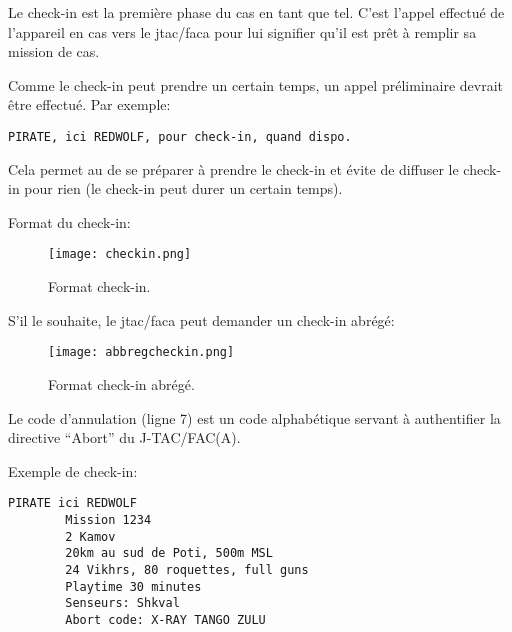 \begin{e1}
	\begin{minipage}{\linewidth}
		\item
		Le check-in est la première phase du \acrshort{cas} en tant que tel. C’est l’appel effectué de l’appareil en \acrshort{cas} vers le \acrshort{jtac}/\acrshort{faca} pour lui signifier qu’il est prêt à remplir sa mission de \acrshort{cas}.
		\item Comme le check-in peut prendre un certain temps, un appel préliminaire devrait être effectué. Par exemple:
		\begin{lstlisting}[caption=Appel préliminaire, label=preliminary_call]
		PIRATE, ici REDWOLF, pour check-in, quand dispo.
		\end{lstlisting}
		Cela permet au \ja{} de se préparer à prendre le check-in et évite de diffuser le check-in pour rien (le check-in peut durer un certain temps).
	\end{minipage}
	
	\begin{minipage}{\linewidth}
		\item Format du check-in:
		\begin{figure}[H]
			\texttt{[image: checkin.png]}
			\caption{Format check-in.}
			\label{fig:checkin}
		\end{figure}	
	\end{minipage}
	
	\begin{minipage}{\linewidth}
		\item S'il le souhaite, le \gls{jtac}/\gls{faca} peut demander un check-in abrégé:
		\begin{figure}[H]
			\texttt{[image: abbregcheckin.png]}
			\caption{Format check-in abrégé.}
			\label{fig:abbregcheckin}
		\end{figure}
	\end{minipage}
	
	\item Le code d’annulation (ligne 7) est un code alphabétique servant à authentifier la directive ``Abort'' du J-TAC/FAC(A).
	
	\begin{minipage}{\linewidth}
		\item Exemple de check-in:
		\begin{lstlisting}[caption=Check-in, label=checkin]
		PIRATE ici REDWOLF
		Mission 1234
		2 Kamov
		20km au sud de Poti, 500m MSL
		24 Vikhrs, 80 roquettes, full guns
		Playtime 30 minutes
		Senseurs: Shkval
		Abort code: X-RAY TANGO ZULU
		\end{lstlisting}
	\end{minipage}
\end{e1}
